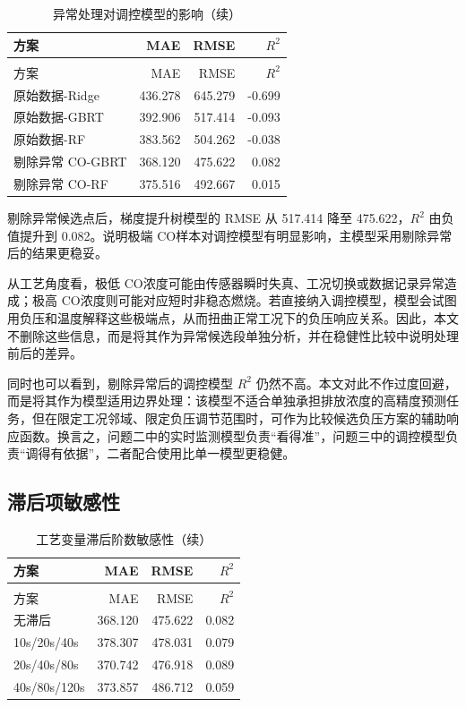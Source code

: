 \documentclass[UTF8,a4paper,zihao=-4]{ctexart}
\newcommand{\CO}{CO}
\begin{document}
\begin{longtable}{l r r r}
\caption{异常处理对调控模型的影响}\\
\toprule
方案 & MAE & RMSE & $R^2$ \\
\midrule
\endfirsthead
\caption[]{异常处理对调控模型的影响（续）}\\
\toprule
方案 & MAE & RMSE & $R^2$ \\
\midrule
\endhead
\bottomrule
\endfoot
原始数据-Ridge & 436.278 & 645.279 & -0.699 \\
原始数据-GBRT & 392.906 & 517.414 & -0.093 \\
原始数据-RF & 383.562 & 504.262 & -0.038 \\
剔除异常 \CO-GBRT & 368.120 & 475.622 & 0.082 \\
剔除异常 \CO-RF & 375.516 & 492.667 & 0.015 \\
\end{longtable}

剔除异常候选点后，梯度提升树模型的 RMSE 从 517.414 降至 475.622，$R^2$ 由负值提升到 0.082。说明极端 \CO 样本对调控模型有明显影响，主模型采用剔除异常后的结果更稳妥。

从工艺角度看，极低 \CO 浓度可能由传感器瞬时失真、工况切换或数据记录异常造成；极高 \CO 浓度则可能对应短时非稳态燃烧。若直接纳入调控模型，模型会试图用负压和温度解释这些极端点，从而扭曲正常工况下的负压响应关系。因此，本文不删除这些信息，而是将其作为异常候选段单独分析，并在稳健性比较中说明处理前后的差异。

同时也可以看到，剔除异常后的调控模型 $R^2$ 仍然不高。本文对此不作过度回避，而是将其作为模型适用边界处理：该模型不适合单独承担排放浓度的高精度预测任务，但在限定工况邻域、限定负压调节范围时，可作为比较候选负压方案的辅助响应函数。换言之，问题二中的实时监测模型负责“看得准”，问题三中的调控模型负责“调得有依据”，二者配合使用比单一模型更稳健。

\subsection{滞后项敏感性}

\begin{longtable}{l r r r}
\caption{工艺变量滞后阶数敏感性}\\
\toprule
方案 & MAE & RMSE & $R^2$ \\
\midrule
\endfirsthead
\caption[]{工艺变量滞后阶数敏感性（续）}\\
\toprule
方案 & MAE & RMSE & $R^2$ \\
\midrule
\endhead
\bottomrule
\endfoot
无滞后 & 368.120 & 475.622 & 0.082 \\
10s/20s/40s & 378.307 & 478.031 & 0.079 \\
20s/40s/80s & 370.742 & 476.918 & 0.089 \\
40s/80s/120s & 373.857 & 486.712 & 0.059 \\
\end{longtable}
\end{document}

